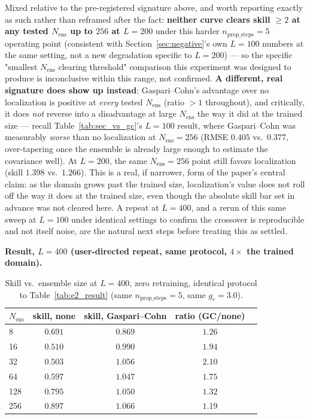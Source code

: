 \documentclass[11pt]{article}
\begin{document}
Mixed relative to the pre-registered signature above, and worth
reporting exactly as such rather than reframed after the fact:
\textbf{neither curve clears skill $\geq 2$ at any tested
$N_{\mathrm{ens}}$ up to $256$ at $L=200$} under this harder
$n_{\mathrm{prop\_steps}}=5$ operating point (consistent with
Section~\ref{sec:negative}'s own $L=100$ numbers at the same setting,
not a new degradation specific to $L=200$) --- so the specific
"smallest $N_{\mathrm{ens}}$ clearing threshold" comparison this
experiment was designed to produce is inconclusive within this range,
not confirmed. \textbf{A different, real signature does show up
instead}: Gaspari--Cohn's advantage over no localization is positive at
\emph{every} tested $N_{\mathrm{ens}}$ (ratio $>1$ throughout), and
critically, it does \emph{not} reverse into a disadvantage at large
$N_{\mathrm{ens}}$ the way it did at the trained size --- recall
Table~\ref{tab:sec_vs_gc}'s $L=100$ result, where Gaspari--Cohn was
measurably \emph{worse} than no localization at $N_{\mathrm{ens}}=256$
(RMSE $0.405$ vs.\ $0.377$, over-tapering once the ensemble is already
large enough to estimate the covariance well). At $L=200$, the same
$N_{\mathrm{ens}}=256$ point still favors localization (skill $1.398$
vs.\ $1.266$). This is a real, if narrower, form of the paper's central
claim: as the domain grows past the trained size, localization's value
does not roll off the way it does at the trained size, even though the
absolute skill bar set in advance was not cleared here. A repeat at
$L=400$, and a rerun of this same sweep at $L=100$ under identical
settings to confirm the crossover is reproducible and not itself
noise, are the natural next steps before treating this as settled.

\textbf{Result, $L=400$ (user-directed repeat, same protocol,
$4\times$ the trained domain).}

\begin{table}[h]
\centering
\begin{tabular}{lcccc}
\toprule
$N_{\mathrm{ens}}$ & skill, none & skill, Gaspari--Cohn & ratio (GC/none) \\
\midrule
8   & $0.691$ & $0.869$ & $1.26$ \\
16  & $0.510$ & $0.990$ & $1.94$ \\
32  & $0.503$ & $1.056$ & $2.10$ \\
64  & $0.597$ & $1.047$ & $1.75$ \\
128 & $0.795$ & $1.050$ & $1.32$ \\
256 & $0.897$ & $1.066$ & $1.19$ \\
\bottomrule
\end{tabular}
\caption{Skill vs.\ ensemble size at $L=400$, zero retraining, identical
protocol to Table~\ref{tab:e2_result} (same $n_{\mathrm{prop\_steps}}=5$,
same $g_c=3.0$).}
\label{tab:e2_result_L400}
\end{table}
\end{document}
